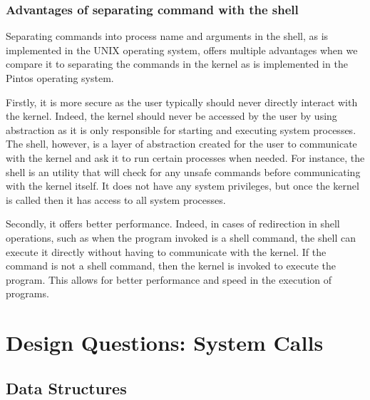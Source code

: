 \documentclass{article}
\renewcommand{\_}{\char`_}
\begin{document}
\subsubsection{Advantages of separating command with the shell}

Separating commands into process name and arguments in the shell, as is implemented in the UNIX operating system, offers multiple advantages when we compare it to separating the commands in the kernel as is implemented in the Pintos operating system.

Firstly, it is more secure as the user typically should never directly interact with the kernel. Indeed, the kernel should never be accessed by the user by using abstraction as it is only responsible for starting and executing system processes. The shell, however, is a layer of abstraction created for the user to communicate with the kernel and ask it to run certain processes when needed. For instance, the shell is an utility that will check for any unsafe commands before communicating with the kernel itself. It does not have any system privileges, but once the kernel is called then it has access to all system processes.

Secondly, it offers better performance. Indeed, in cases of redirection in shell operations, such as when the program invoked is a shell command, the shell can execute it directly without having to communicate with the kernel. If the command is not a shell command, then the kernel is invoked to execute the program. This allows for better performance and speed in the execution of programs.


\section{Design Questions: System Calls}
\subsection{Data Structures}
\end{document}
